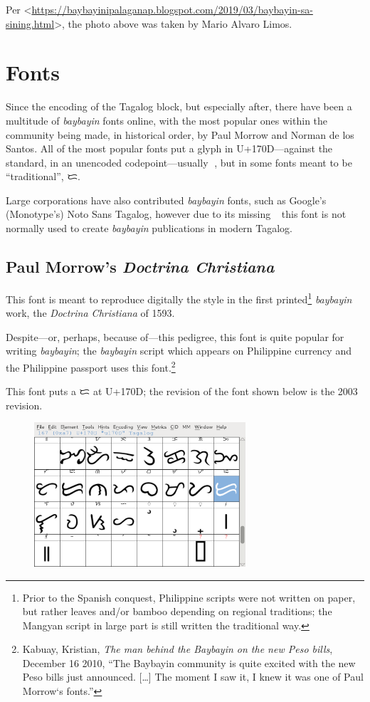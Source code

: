 \documentclass[a4paper,pagesize,openany,14pt,parskip=never]{scrbook}
\newcommand{\≈}{$\approx$}
\newcommand{\ra}{{\baybayin ᜍ}}
\begin{document}
Per <\url{https://baybayinipalaganap.blogspot.com/2019/03/baybayin-sa-sining.html}>, the photo above was taken by Mario Alvaro Limos.

\section{Fonts}
\label{Fonts}

Since the encoding of the Tagalog block, but especially after, there have been a multitude of {\em baybayin} fonts online, with the most popular ones within the community being made, in historical order, by Paul Morrow and Norman de los Santos. All of the most popular fonts put a glyph in U+170D---against the standard, in an unencoded codepoint---usually \ra, but in some fonts meant to be ``traditional'', {\baybayin ᜇ}.

Large corporations have also contributed {\em baybayin} fonts, such as Google's (Monotype's) Noto Sans Tagalog, however due to its missing \ra\ this font is not normally used to create {\em baybayin} publications in modern Tagalog.

\subsection{Paul Morrow's {\em Doctrina Christiana}}

This font is meant to reproduce digitally the style in the first printed\footnote{Prior to the Spanish conquest, Philippine scripts were not written on paper, but rather leaves and/or bamboo depending on regional traditions; the Mangyan script in large part is still written the traditional way.} {\em baybayin} work, the {\em Doctrina Christiana} of 1593.

Despite---or, perhaps, because of---this pedigree, this font is quite popular for writing {\em baybayin}; the {\em baybayin} script which appears on Philippine currency and the Philippine passport uses this font.\footnote{Kabuay, Kristian, {\em The man behind the Baybayin on the new Peso bills}, December 16 2010, ``The Baybayin community is quite excited with the new Peso bills just announced. [\ldots] The moment I saw it, I knew it was one of Paul Morrow‘s fonts.''}

This font puts a {\baybayin ᜇ} at U+170D; the revision of the font shown below is the 2003 revision.

\begin{figure}[H]
\includegraphics[width=0.7\textwidth]{TD1593}
\end{figure}
\end{document}

